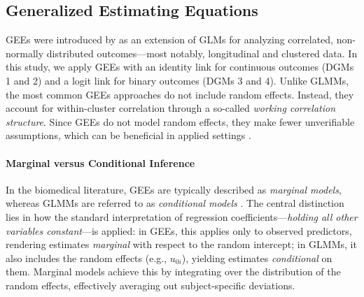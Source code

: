 \documentclass[stu]{apa7}
\begin{document}
\subsection{Generalized Estimating Equations}

GEEs were introduced by \textcite{liang_longitudinal_1986} as an extension of GLMs for analyzing correlated, non-normally distributed outcomes—most notably, longitudinal and clustered data. In this study, we apply GEEs with an identity link for continuous outcomes (DGMs 1 and 2) and a logit link for binary outcomes (DGMs 3 and 4). Unlike GLMMs, the most common GEEs approaches do not include random effects. Instead, they account for within-cluster correlation through a so-called \textit{working correlation structure}. Since GEEs do not model random effects, they make fewer unverifiable assumptions, which can be beneficial in applied settings \parencite[]{mcneish_unnecessary_2017, hubbard_gee_2010}.

\paragraph{Marginal versus Conditional Inference}

In the biomedical literature, GEEs are typically described as \textit{marginal models}, whereas GLMMs are referred to as \textit{conditional models} \parencite[e.g.,][]{diggle_analysis_2002}. The central distinction lies in how the standard interpretation of regression coefficients---\textit{holding all other variables constant}---is applied: in GEEs, this applies only to observed predictors, rendering estimates \textit{marginal} with respect to the random intercept; in GLMMs, it also includes the random effects (e.g., \( u_{0i} \)), yielding estimates \textit{conditional} on them. Marginal models achieve this by integrating over the distribution of the random effects, effectively averaging out subject-specific deviations.
\end{document}
